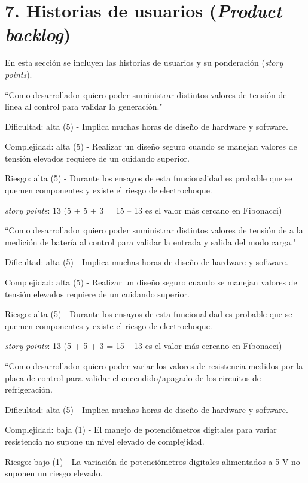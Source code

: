 \documentclass[
11pt, %
codirector, %
]{charter}
\begin{document}
\section{7. Historias de usuarios (\textit{Product backlog})}
\label{sec:backlog}

En esta sección se incluyen las historias de usuarios y su ponderación (\textit{story points}).

``Como desarrollador quiero poder suministrar distintos valores de tensión de linea al control para validar la generación."

Dificultad: alta (5) - Implica muchas horas de diseño de hardware y software.

Complejidad: alta (5) - Realizar un diseño seguro cuando se manejan valores de tensión elevados requiere de un cuidando superior.

Riesgo: alta (5) - Durante los ensayos de esta funcionalidad es probable que se quemen componentes y existe el riesgo de electrochoque.

\textit{story points}: 13
(5 + 5 + 3 = 15 -- 13 es el valor más cercano en Fibonacci)

``Como desarrollador quiero poder suministrar distintos valores de tensión de a la medición de batería al control para validar la entrada y salida del modo carga."

Dificultad: alta (5) - Implica muchas horas de diseño de hardware y software.

Complejidad: alta (5) - Realizar un diseño seguro cuando se manejan valores de tensión elevados requiere de un cuidando superior.

Riesgo: alta (5) - Durante los ensayos de esta funcionalidad es probable que se quemen componentes y existe el riesgo de electrochoque.

\textit{story points}: 13
(5 + 5 + 3 = 15 -- 13 es el valor más cercano en Fibonacci)

``Como desarrollador quiero poder variar los valores de resistencia medidos por la placa de control para validar el encendido/apagado de los circuitos de refrigeración.

Dificultad: alta (5) - Implica muchas horas de diseño de hardware y software.

Complejidad: baja (1) - El manejo de potenciómetros digitales para variar resistencia no supone un nivel elevado de complejidad.

Riesgo: bajo (1) - La variación de potenciómetros digitales alimentados a 5 V no suponen un riesgo elevado.
\end{document}
